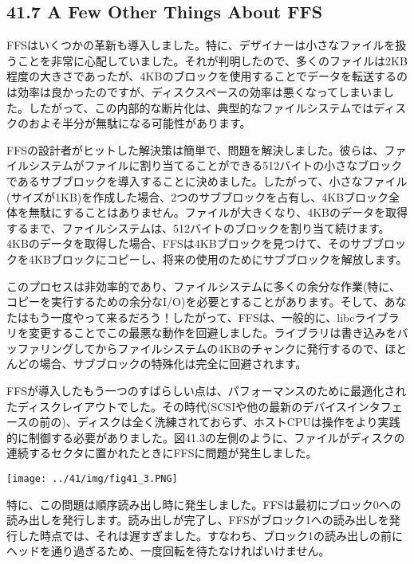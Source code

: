 \hypertarget{a-few-other-things-about-ffs}{%
\subsection*{41.7 A Few Other Things About
FFS}\label{a-few-other-things-about-ffs}}

FFSはいくつかの革新も導入しました。特に、デザイナーは小さなファイルを扱うことを非常に心配していました。それが判明したので、多くのファイルは2KB程度の大きさであったが、4KBのブロックを使用することでデータを転送するのは効率は良かったのですが、ディスクスペースの効率は悪くなってしまいました。したがって、この内部的な断片化は、典型的なファイルシステムではディスクのおよそ半分が無駄になる可能性があります。

FFSの設計者がヒットした解決策は簡単で、問題を解決しました。彼らは、ファイルシステムがファイルに割り当てることができる512バイトの小さなブロックであるサブブロックを導入することに決めました。したがって、小さなファイル(サイズが1KB)を作成した場合、2つのサブブロックを占有し、4KBブロック全体を無駄にすることはありません。ファイルが大きくなり、4KBのデータを取得するまで、ファイルシステムは、512バイトのブロックを割り当て続けます。4KBのデータを取得した場合、FFSは4KBブロックを見つけて、そのサブブロックを4KBブロックにコピーし、将来の使用のためにサブブロックを解放します。

このプロセスは非効率的であり、ファイルシステムに多くの余分な作業(特に、コピーを実行するための余分なI/O)を必要とすることがあります。そして、あなたはもう一度やって来るだろう！したがって、FFSは、一般的に、libcライブラリを変更することでこの最悪な動作を回避しました。ライブラリは書き込みをバッファリングしてからファイルシステムの4KBのチャンクに発行するので、ほとんどの場合、サブブロックの特殊化は完全に回避されます。

FFSが導入したもう一つのすばらしい点は、パフォーマンスのために最適化されたディスクレイアウトでした。その時代(SCSIや他の最新のデバイスインタフェースの前の)、ディスクは全く洗練されておらず、ホストCPUは操作をより実践的に制御する必要がありました。図41.3の左側のように、ファイルがディスクの連続するセクタに置かれたときにFFSに問題が発生しました。

\texttt{[image: ../41/img/fig41\_3.PNG]}

特に、この問題は順序読み出し時に発生しました。FFSは最初にブロック0への読み出しを発行します。読み出しが完了し、FFSがブロック1への読み出しを発行した時点では、それは遅すぎました。すなわち、ブロック1の読み出しの前にヘッドを通り過ぎるため、一度回転を待たなければいけません。

